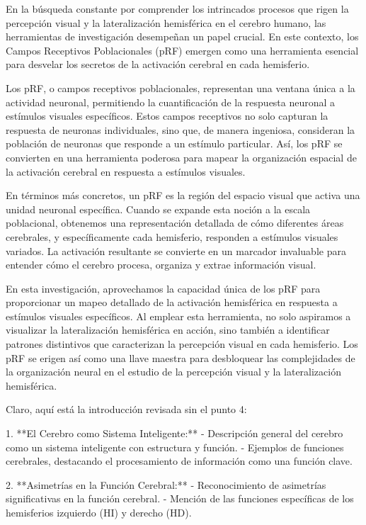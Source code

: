 \documentclass{article}
\begin{document}
	En la búsqueda constante por comprender los intrincados procesos que rigen la percepción visual y la lateralización hemisférica en el cerebro humano, las herramientas de investigación desempeñan un papel crucial. En este contexto, los Campos Receptivos Poblacionales (pRF) emergen como una herramienta esencial para desvelar los secretos de la activación cerebral en cada hemisferio.
	
	Los pRF, o campos receptivos poblacionales, representan una ventana única a la actividad neuronal, permitiendo la cuantificación de la respuesta neuronal a estímulos visuales específicos. Estos campos receptivos no solo capturan la respuesta de neuronas individuales, sino que, de manera ingeniosa, consideran la población de neuronas que responde a un estímulo particular. Así, los pRF se convierten en una herramienta poderosa para mapear la organización espacial de la activación cerebral en respuesta a estímulos visuales.
	
	En términos más concretos, un pRF es la región del espacio visual que activa una unidad neuronal específica. Cuando se expande esta noción a la escala poblacional, obtenemos una representación detallada de cómo diferentes áreas cerebrales, y específicamente cada hemisferio, responden a estímulos visuales variados. La activación resultante se convierte en un marcador invaluable para entender cómo el cerebro procesa, organiza y extrae información visual.
	
	En esta investigación, aprovechamos la capacidad única de los pRF para proporcionar un mapeo detallado de la activación hemisférica en respuesta a estímulos visuales específicos. Al emplear esta herramienta, no solo aspiramos a visualizar la lateralización hemisférica en acción, sino también a identificar patrones distintivos que caracterizan la percepción visual en cada hemisferio. Los pRF se erigen así como una llave maestra para desbloquear las complejidades de la organización neural en el estudio de la percepción visual y la lateralización hemisférica.
	\newpage
	
	Claro, aquí está la introducción revisada sin el punto 4:
	
	1. **El Cerebro como Sistema Inteligente:**
	- Descripción general del cerebro como un sistema inteligente con estructura y función.
	- Ejemplos de funciones cerebrales, destacando el procesamiento de información como una función clave.
	
	2. **Asimetrías en la Función Cerebral:**
	- Reconocimiento de asimetrías significativas en la función cerebral.
	- Mención de las funciones específicas de los hemisferios izquierdo (HI) y derecho (HD).
	
\end{document}
